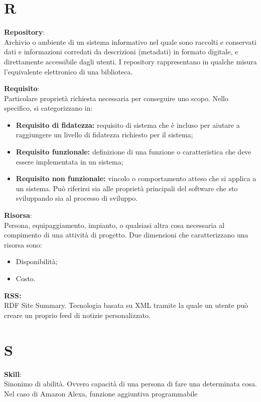 \documentclass[a4paper, oneside, openany, dvipsnames, table]{article}
\begin{document}
\newpage
\section{R}
\textbf{Repository}:\\	Archivio o ambiente di un sistema informativo nel quale sono raccolti e conservati dati e informazioni corredati da descrizioni (metadati) in formato digitale, e direttamente accessibile dagli utenti. I repository rappresentano in qualche misura l’equivalente elettronico di una biblioteca.

\textbf{Requisito}:\\	Particolare proprietà richiesta necessaria per conseguire uno scopo. Nello specifico, si categorizzano in:
\begin{itemize}
	\item \textbf{Requisito di fidatezza:} requisito di sistema che è incluso per aiutare a raggiungere un livello di fidatezza richiesto per il sistema;
	\item \textbf{Requisito funzionale:} definizione di una funzione o caratteristica che deve essere implementata in un sistema;
	\item \textbf{Requisito non funzionale:} vincolo o comportamento atteso che si applica a un sistema. Può riferirsi sia alle proprietà principali del software che sto sviluppando sia al processo di sviluppo.
\end{itemize}

\textbf{Risorsa}:\\	Persona, equipaggiamento, impianto, o qualsiasi altra cosa necessaria al compimento di una attività di progetto. Due dimensioni che caratterizzano una risorsa sono:
\begin{itemize}
\item Disponibilità;
\item Costo.
\end{itemize} 

\textbf{RSS:}\\
RDF Site Summary. Tecnologia basata su XML tramite la quale un utente può creare un proprio feed di notizie personalizzato.

\newpage
\section{S}
\textbf{Skill}:\\	Sinonimo di abilità. Ovvero capacità di una persona di fare una determinata cosa. Nel caso di Amazon Alexa, funzione aggiuntiva programmabile
\end{document}
